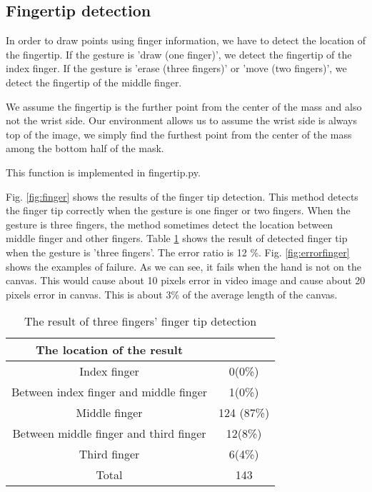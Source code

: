 \subsection{Fingertip detection}
In order to draw points using finger information, we have to detect the location of the fingertip.
If the gesture is 'draw (one finger)', we detect the fingertip of the index finger. 
If the gesture is 'erase (three fingers)' or 'move (two fingers)', we detect the fingertip of the middle finger. \par
We assume the fingertip is the further point from the center of the mass and also not the wrist side.
Our environment allows us to assume the wrist side is always top of the image, we simply find the furthest point from the center of the mass among the bottom half of the mask.

This function is implemented in fingertip.py. 

Fig. \ref{fig:finger} shows the results of the finger tip detection.
This method detects the finger tip correctly when the gesture is one finger or two fingers.
When the gesture is three fingers, the method sometimes detect the location between middle finger and other fingers.
Table \ref{tb:finger} shows the result of detected finger tip when the gesture is 'three fingers'.
The error ratio is 12 \%. Fig. \ref{fig:errorfinger} shows the examples of failure. As we can see, it fails when the hand is not on the canvas. This would cause about 10 pixels error in video image and cause about 20 pixels error in canvas. This is about 3\% of the average length of the canvas.

\begin{table}
 \caption{The result of three fingers' finger tip detection}
 \label{tb:finger}
 \begin{tabular}{|c|c|}
 \hline
 The location of the result &  \\ \hline
 Index finger & 0(0\%) \\ \hline
 Between index finger and middle finger & 1(0\%) \\ \hline
 Middle finger & 124 (87\%) \\ \hline
 Between middle finger and third finger & 12(8\%) \\ \hline
 Third finger & 6(4\%) \\ \hline
 Total & 143 \\ \hline
 \end{tabular}
\end{table}
